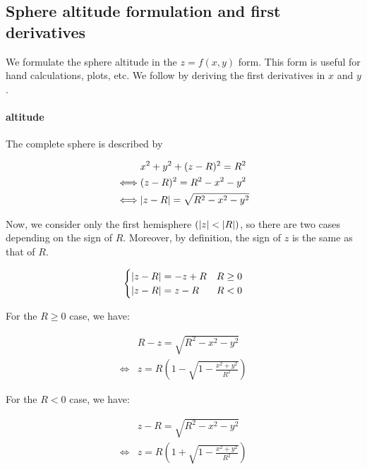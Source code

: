 \subsection{Sphere altitude formulation and first derivatives}
We formulate the sphere altitude in the $z = f(x, y)$ form. This form
is useful for hand calculations, plots, etc. We follow by deriving the
first derivatives in $x$ and $y$.

\paragraph{altitude}
The complete sphere is described by

\begin{equation}
\begin{split}
& x^2 + y^2 + (z - R)^2 = R^2 \\
\iff & (z - R)^2 = R^2 - x^2 - y^2 \\
\iff & \abs{z-R} = \sqrt{R^2 - x^2 - y^2}
\end{split} \end{equation}

Now, we consider only the first hemisphere $(\abs{z} < \abs{R})$, so
there are two cases depending on the sign of $R$. Moreover, by definition,
the sign of $z$ is the same as that of $R$.

\begin{equation} \begin{cases}
\abs{z - R} = -z + R & R \geq 0 \\
\abs{z - R} = z - R & R < 0
\end{cases} \end{equation}

For the $R \geq 0$ case, we have:

\begin{equation} \begin{split}
& R - z = \sqrt{R^2 -x^2 -y^2} \\
\iff & z = R \left( 1 - \sqrt{1 - \frac{x^2 + y^2}{R^2}} \right)
\end{split} \end{equation}

For the $R < 0$ case, we have:

\begin{equation} \begin{split}
& z - R = \sqrt{R^2 -x^2 -y^2} \\
\iff & z = R \left( 1 + \sqrt{1 - \frac{x^2 + y^2}{R^2}} \right)
\end{split} \end{equation}

